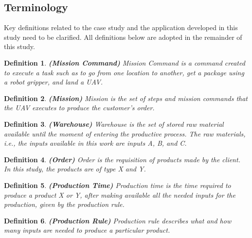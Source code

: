 \documentclass[conference,harvard,brazil,english]{sbatex}
\newtheorem{myDefinition}{Definition}
\begin{document}
\subsection{Terminology}
\label{sec:terms}

Key definitions related to the case study and the application developed in this study need to be clarified. All definitions below are adopted in the remainder of this study.

\begin{myDefinition} 
\textbf{(Mission Command)} 
Mission Command is a command created to execute a task such as to go from one location to another, get a package using a robot gripper, and land a UAV.
\label{def:missioncommand}
\end{myDefinition}

\begin{myDefinition}
\textbf{(Mission)} 
Mission is the set of steps and mission commands that the UAV executes to produce the customer's order.
\label{def:mission}
\end{myDefinition}

\begin{myDefinition}
\textbf{(Warehouse)}
Warehouse is the set of stored raw material available until the moment of entering the productive process. The raw materials, i.e., the inputs available in this work are inputs A, B, and C.
\label{def:almoxarifado}
\end{myDefinition}

\begin{myDefinition} 
\textbf{(Order)}
Order is the requisition of products made by the client. In this study, the products are of type X and Y.
\label{def:pedido}
\end{myDefinition}

\begin{myDefinition}
\textbf{(Production Time)}
Production time is the time required to produce a product X or Y, after making available all the needed inputs for the production, given by the production rule.
\label{def:tempoProducao}
\end{myDefinition}

\begin{myDefinition}
 \textbf{(Production Rule)}
Production rule describes what and how many inputs are needed to produce a particular product.
\label{def:regraProducao}
\end{myDefinition}
\end{document}
